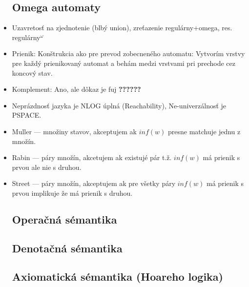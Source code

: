 \documentclass[paper=a4, fontsize=11pt]{scrartcl} %
\numberwithin{equation}{section} %
\numberwithin{figure}{section} %
\numberwithin{table}{section} %
\begin{document}
\begin{itemize}
	\subsection{Omega automaty}
	
	\item Uzavretosť na zjednotenie (blbý union), zreťazenie regulárny+omega, res. regulárny$^\omega$
	
	\item Prienik: Konštrukcia ako pre prevod zobecneného automatu: Vytvorím vrstvy pre každý prienikovaný automat a behám medzi vrstvami pri prechode cez koncový stav.
	
	\item Komplement: Ano, ale dôkaz je fuj \textbf{??????} 
	
	\item Neprázdnosť jazyka je NLOG úplná (Reachability), Ne-univerzálnosť je PSPACE.
	
	\item Muller — množiny stavov, akceptujem ak $inf(w)$ presne matchuje jednu z množín.
	
	\item Rabin — páry množín, akcetujem ak existujé pár t.ž. $inf(w)$ má prienik s prvou ale nie s druhou.
	
	\item Street — páry množín, akceptujem ak pre všetky páry $inf(w)$ má prienik s prvou implikuje že má prienik s druhou.
	
	\subsection{Operačná sémantika}
	
	\subsection{Denotačná sémantika}
	
	\subsection{Axiomatická sémantika (Hoareho logika)}
\end{itemize}
\end{document}
